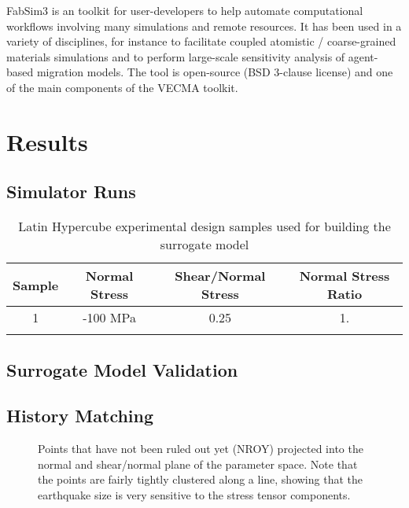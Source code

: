 \documentclass[openacc]{rstransa}%
\begin{document}
FabSim3 is an toolkit for user-developers to help automate computational workflows involving many simulations and remote resources. It has been used in a variety of disciplines, for instance to facilitate coupled atomistic / coarse-grained materials simulations and to perform large-scale sensitivity analysis of agent-based migration models. The tool is open-source (BSD 3-clause license) and one of the main components of the VECMA toolkit.

\section{Results}

\subsection{Simulator Runs}

\begin{table}[!h]
\caption{Latin Hypercube experimental design samples used for building the surrogate model}
\label{table_lhc}
\begin{tabular}{cccc}%
\hline
Sample & Normal Stress & Shear/Normal Stress & Normal Stress Ratio \\
\hline
1 & -100 MPa & 0.25 & 1. \\
\\\hline
\end{tabular}
\vspace*{-4pt}
\end{table}%

\subsection{Surrogate Model Validation}

\subsection{History Matching}

\begin{figure}[!h]
\caption{Points that have not been ruled out yet (NROY) projected into the normal and shear/normal plane of the parameter space. Note that the points are fairly tightly clustered along a line, showing that the earthquake size is very sensitive to the stress tensor components.}
\label{fig_nroy}
\end{figure}
\end{document}
